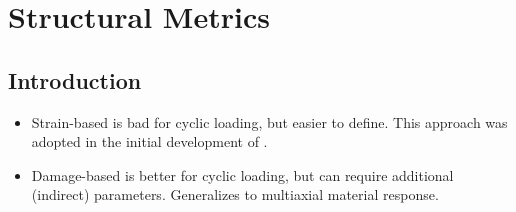 

\chapter{Structural Metrics}\label{ch:predictor_t1}

\begingroup 
\newcommand{\gls}[1]{#1}
\newcommand{\glspl}[1]{#1}

\newcommand{\SectionCover}{\Section_{\mathrm{cover}}}
\newcommand{\SectionCore}{\Section_{\mathrm{core}}}
\newcommand{\SectionConc}{\Section_{\mathrm{conc}}}
\newcommand{\SectionSteel}{\Section_{\mathrm{steel}}}
\newcommand{\SectionCoverNormal}{\bm{\nu}_{\mathrm{cover}}}
\newcommand{\SectionCoreNormal}{\bm{\nu}_{\mathrm{core}}}
\newcommand{\SectionSteelNormal}{\bm{\nu}_{\mathrm{steel}}}

\section{Introduction}

\begin{itemize}
    \item Strain-based is bad for cyclic loading, but easier to define. This approach was adopted in the initial development of \BRACE{} \citep{mosalam2021brace2}.
    \item Damage-based is better for cyclic loading, but can require additional (indirect) parameters. Generalizes to multiaxial material response.
\end{itemize}

